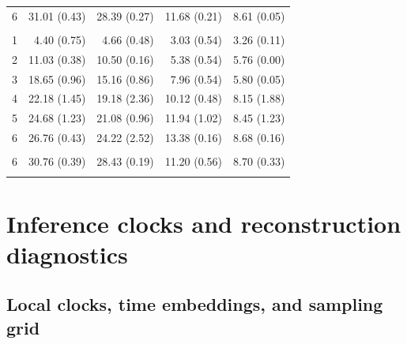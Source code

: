 \documentclass{article}
\begin{document}
\begin{table}[htbp]
\begin{tabular}{@{}rrrrr@{}}
6 & 31.01 {\scriptsize (0.43)} & 28.39 {\scriptsize (0.27)} & 11.68 {\scriptsize (0.21)} & 8.61 {\scriptsize (0.05)} \\
\addlinespace
\multicolumn{5}{@{}l}{$t=\tau$}\\
1 & 4.40 {\scriptsize (0.75)} & 4.66 {\scriptsize (0.48)} & 3.03 {\scriptsize (0.54)} & 3.26 {\scriptsize (0.11)} \\
2 & 11.03 {\scriptsize (0.38)} & 10.50 {\scriptsize (0.16)} & 5.38 {\scriptsize (0.54)} & 5.76 {\scriptsize (0.00)} \\
3 & 18.65 {\scriptsize (0.96)} & 15.16 {\scriptsize (0.86)} & 7.96 {\scriptsize (0.54)} & 5.80 {\scriptsize (0.05)} \\
4 & 22.18 {\scriptsize (1.45)} & 19.18 {\scriptsize (2.36)} & 10.12 {\scriptsize (0.48)} & 8.15 {\scriptsize (1.88)} \\
5 & 24.68 {\scriptsize (1.23)} & 21.08 {\scriptsize (0.96)} & 11.94 {\scriptsize (1.02)} & 8.45 {\scriptsize (1.23)} \\
6 & 26.76 {\scriptsize (0.43)} & 24.22 {\scriptsize (2.52)} & 13.38 {\scriptsize (0.16)} & 8.68 {\scriptsize (0.16)} \\
\addlinespace
\multicolumn{5}{@{}l}{Epoch-six summary: $t=\tau^2$, four seeds}\\
6 & 30.76 {\scriptsize (0.39)} & 28.43 {\scriptsize (0.19)} & 11.20 {\scriptsize (0.56)} & 8.70 {\scriptsize (0.33)} \\
\addlinespace
\bottomrule
\end{tabular}
\end{table}

\clearpage
\section{Inference clocks and reconstruction diagnostics}
\label{app:inferenceclocks}

\subsection{Local clocks, time embeddings, and sampling grid}
\end{document}
